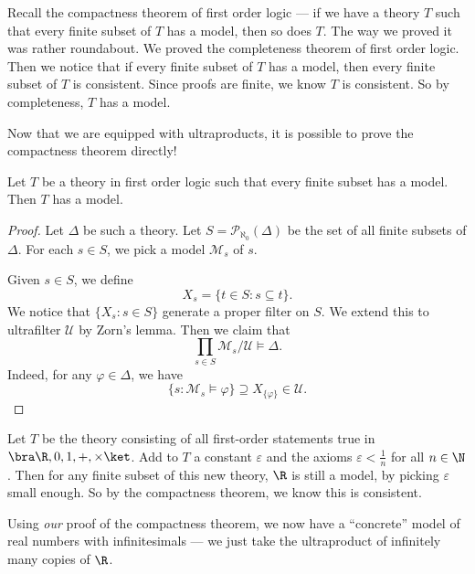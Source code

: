 \documentclass[a4paper]{article}
\begin{document}
Recall the compactness theorem of first order logic --- if we have a theory $T$ such that every finite subset of $T$ has a model, then so does $T$. The way we proved it was rather roundabout. We proved the completeness theorem of first order logic. Then we notice that if every finite subset of $T$ has a model, then every finite subset of $T$ is consistent. Since proofs are finite, we know $T$ is consistent. So by completeness, $T$ has a model.

Now that we are equipped with ultraproducts, it is possible to prove the compactness theorem directly!
\begin{thm}
  Let $T$ be a theory in first order logic such that every finite subset has a model. Then $T$ has a model.
\end{thm}

\begin{proof}
  Let $\Delta$ be such a theory. Let $S = \mathcal{P}_{\aleph_0}(\Delta)$ be the set of all finite subsets of $\Delta$. For each $s \in S$, we pick a model $\mathcal{M}_s$ of $s$.

  Given $s \in S$, we define
  \[
    X_s = \{t \in S: s \subseteq t\}.
  \]
  We notice that $\{X_s: s \in S\}$ generate a proper filter on $S$. We extend this to ultrafilter $\mathcal{U}$ by Zorn's lemma. Then we claim that
  \[
    \prod_{s \in S} \mathcal{M}_s/\mathcal{U}\vDash \Delta.
  \]
  Indeed, for any $\varphi \in \Delta$, we have
  \[
    \{s: \mathcal{M}_s \vDash \varphi\} \supseteq X_{\{\varphi\}} \in \mathcal{U}.
  \]
\end{proof}

\begin{eg}
  Let $T$ be the theory consisting of all first-order statements true in $\bra \R, 0, 1, +, \times\ket$. Add to $T$ a constant $\varepsilon$ and the axioms $\varepsilon < \frac{1}{n}$ for all $n \in \N$. Then for any finite subset of this new theory, $\R$ is still a model, by picking $\varepsilon$ small enough. So by the compactness theorem, we know this is consistent.

  Using \emph{our} proof of the compactness theorem, we now have a ``concrete'' model of real numbers with infinitesimals --- we just take the ultraproduct of infinitely many copies of $\R$.
\end{eg}
\end{document}

